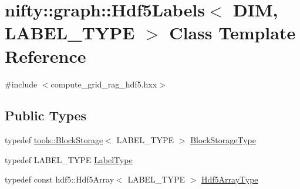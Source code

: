\hypertarget{classnifty_1_1graph_1_1Hdf5Labels}{}\section{nifty\+:\+:graph\+:\+:Hdf5\+Labels$<$ D\+I\+M, L\+A\+B\+E\+L\+\_\+\+T\+Y\+P\+E $>$ Class Template Reference}
\label{classnifty_1_1graph_1_1Hdf5Labels}


{\ttfamily \#include $<$compute\+\_\+grid\+\_\+rag\+\_\+hdf5.\+hxx$>$}

\subsection*{Public Types}
\begin{DoxyCompactItemize}
\item 
typedef \hyperlink{classnifty_1_1tools_1_1BlockStorage}{tools\+::\+Block\+Storage}$<$ L\+A\+B\+E\+L\+\_\+\+T\+Y\+P\+E $>$ \hyperlink{classnifty_1_1graph_1_1Hdf5Labels_abfffba953f16947d3907634b3aabdcad}{Block\+Storage\+Type}
\item 
typedef L\+A\+B\+E\+L\+\_\+\+T\+Y\+P\+E \hyperlink{classnifty_1_1graph_1_1Hdf5Labels_a478cbee39d8a05949fe2fe4f9dd4f382}{Label\+Type}
\item 
typedef const hdf5\+::\+Hdf5\+Array$<$ L\+A\+B\+E\+L\+\_\+\+T\+Y\+P\+E $>$ \hyperlink{classnifty_1_1graph_1_1Hdf5Labels_a2cfeca010fa78ee8fdfa1767ae0fbe4a}{Hdf5\+Array\+Type}
\end{DoxyCompactItemize}
